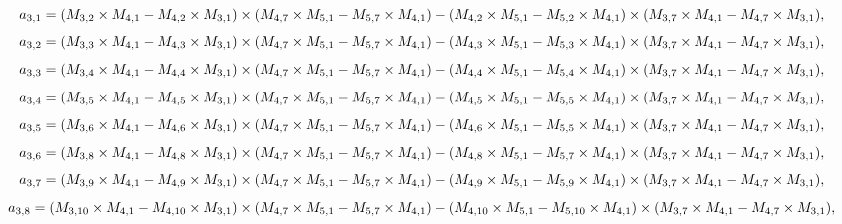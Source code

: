 \documentclass[10pt]{asme2ej}
\begin{document}
\begin{landscape}
\begin{equation}
    a_{3,1} = (M_{3,2}\times M_{4,1}-M_{4,2}\times M_{3,1})\times (M_{4,7}\times M_{5,1}-M_{5,7}\times M_{4,1})\\-(M_{4,2}\times M_{5,1}-M_{5,2}\times M_{4,1})\times (M_{3,7}\times M_{4,1}-M_{4,7}\times M_{3,1}),
\end{equation}
\begin{equation}
    a_{3,2} = (M_{3,3}\times M_{4,1}-M_{4,3}\times M_{3,1})\times (M_{4,7}\times M_{5,1}-M_{5,7}\times M_{4,1})\\-(M_{4,3}\times M_{5,1}-M_{5,3}\times M_{4,1})\times (M_{3,7}\times M_{4,1}-M_{4,7}\times M_{3,1}),
\end{equation}
\begin{equation}
    a_{3,3} = (M_{3,4}\times M_{4,1}-M_{4,4}\times M_{3,1})\times (M_{4,7}\times M_{5,1}-M_{5,7}\times M_{4,1})\\-(M_{4,4}\times M_{5,1}-M_{5,4}\times M_{4,1})\times (M_{3,7}\times M_{4,1}-M_{4,7}\times M_{3,1}),
\end{equation}
\begin{equation}
    a_{3,4} = (M_{3,5}\times M_{4,1}-M_{4,5}\times M_{3,1})\times (M_{4,7}\times M_{5,1}-M_{5,7}\times M_{4,1})\\-(M_{4,5}\times M_{5,1}-M_{5,5}\times M_{4,1})\times (M_{3,7}\times M_{4,1}-M_{4,7}\times M_{3,1}),
\end{equation}
\begin{equation}
    a_{3,5} = (M_{3,6}\times M_{4,1}-M_{4,6}\times M_{3,1})\times (M_{4,7}\times M_{5,1}-M_{5,7}\times M_{4,1})\\-(M_{4,6}\times M_{5,1}-M_{5,5}\times M_{4,1})\times (M_{3,7}\times M_{4,1}-M_{4,7}\times M_{3,1}),
\end{equation}
\begin{equation}
    a_{3,6} = (M_{3,8}\times M_{4,1}-M_{4,8}\times M_{3,1})\times (M_{4,7}\times M_{5,1}-M_{5,7}\times M_{4,1})\\-(M_{4,8}\times M_{5,1}-M_{5,7}\times M_{4,1})\times (M_{3,7}\times M_{4,1}-M_{4,7}\times M_{3,1}),
\end{equation}
\begin{equation}
    a_{3,7} = (M_{3,9}\times M_{4,1}-M_{4,9}\times M_{3,1})\times (M_{4,7}\times M_{5,1}-M_{5,7}\times M_{4,1})\\-(M_{4,9}\times M_{5,1}-M_{5,9}\times M_{4,1})\times (M_{3,7}\times M_{4,1}-M_{4,7}\times M_{3,1}),
\end{equation}
\begin{equation}
    a_{3,8} = (M_{3,10}\times M_{4,1}-M_{4,10}\times M_{3,1})\times (M_{4,7}\times M_{5,1}-M_{5,7}\times M_{4,1})\\-(M_{4,10}\times M_{5,1}-M_{5,10}\times M_{4,1})\times (M_{3,7}\times M_{4,1}-M_{4,7}\times M_{3,1}),

\end{equation}
\end{landscape}
\end{document}

